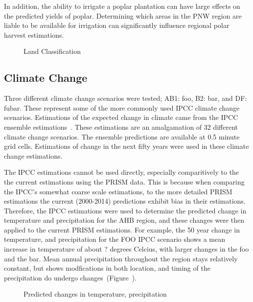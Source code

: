 \documentclass[preprint,12pt]{elsarticle}
\begin{document}
{In addition, the ability to irrigate a poplar plantation can have
large effects on the predicted yields of poplar.  Determining which
areas in the \ac{PNW} region are liable to be available for irrigation
can significantly influence regional polar harvest estimations.  



\begin{figure}[hp]
  \centering
  
  \caption{Land Classification}
  \label{fig:land}
\end{figure}

\subsection{Climate Change}
\label{sec:climate}

Three different climate change scenarios were tested; AB1: foo, B2:
bar, and DF: fubar.  These represent some of the more commonly used
IPCC climate change scenarios.  Estimations of the expected change in
climate came from the IPCC ensemble estimations~\cite{ipcc-ensemble}.
These estimations are an amalgamation of 32 different climate change
scenarios.  The ensemble predictions are available at 0.5 minute grid
cells.  Estimations of change in the next fifty years were used in
these climate change estimations.

The \ac{IPCC} estimations cannot be used directly, especially
comparitively to the the current estimations using the \ac{PRISM}
data.  This is because when comparing the \ac{IPCC}'s somewhat coarse
scale estimations, to the more detailed \ac{PRISM} estimations the
current (2000-2014) predictions exhibit bias in their estimations.
Therefore, the \ac{IPCC} estimations were used to determine the
predicted change in temperature and precipitation for the \ac {AHB}
region, and these changes were then applied to the current \ac{PRISM}
estimations. For example, the 50 year change in temperature, and
precipitation for the \ac{FOO} \ac{IPCC} scenario shows a mean
increase in temperature of about ? degrees Celcius, with larger
changes in the foo and the bar.  Mean annual precipitation throughout
the region stays relatively constant, but shows modfications in both
location, and timing of the precipitation do undergo
changes~(Figure~\cite{fig:new-temp}).

\begin{figure}[hp]
  \centering
  
  \caption{Predicted changes in temperature, precipitation }
  \label{fig:new-temp}
\end{figure}

}
\end{document}
